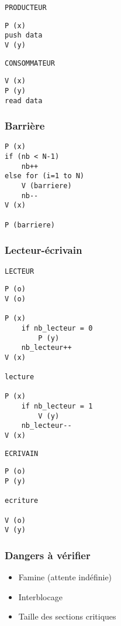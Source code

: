 \documentclass[a4paper]{article}
\begin{document}
\begin{multicols*}{2}
    \begin{multicols}{2}
        \texttt{PRODUCTEUR}
        \begin{lstlisting}
P (x) 
push data
V (y)
        \end{lstlisting}
        \columnbreak{}
        \texttt{CONSOMMATEUR}
        \hspace{0cm}
        \begin{lstlisting}
V (x) 
P (y) 
read data
        \end{lstlisting}
    \end{multicols}

    \subsubsection{Barrière}

    \begin{lstlisting}[frame=shadowbox]
P (x)
if (nb < N-1)
    nb++
else for (i=1 to N) 
    V (barriere)
    nb--
V (x)

P (barriere)
    \end{lstlisting}

    \subsubsection{Lecteur-\'ecrivain}

    \texttt{LECTEUR}
    \begin{lstlisting}[frame=shadowbox]
P (o)
V (o)

P (x)
    if nb_lecteur = 0
        P (y)
    nb_lecteur++
V (x)

lecture

P (x)
    if nb_lecteur = 1
        V (y)
    nb_lecteur--
V (x)
    \end{lstlisting}

    \pagebreak

    \texttt{ECRIVAIN}
    \begin{lstlisting}[frame=shadowbox]
P (o)
P (y)

ecriture

V (o)
V (y)
    \end{lstlisting}

    \subsubsection{Dangers à vérifier}

    \begin{itemize}
        \item Famine (attente indéfinie)
        \item Interblocage
        \item Taille des sections critiques
    \end{itemize}


\end{multicols*}
\end{document}
